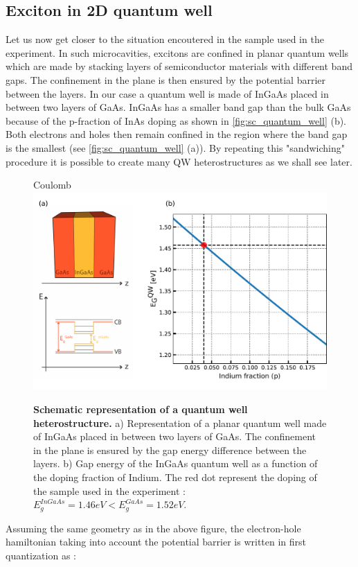 \subsection{Exciton in 2D quantum well}

Let us now get closer to the situation encoutered in the sample used in the experiment. In such microcavities, excitons are confined in planar quantum wells 
which are made by stacking layers of semiconductor materials with different band gaps. The confinement in the plane is then ensured by the potential barrier between the layers.
In our case a quantum well is made of InGaAs placed in between two layers of GaAs. InGaAs has a smaller band gap than the bulk GaAs because of the p-fraction of InAs doping as shown in \autoref{fig:sc_quantum_well} (b). 
Both electrons and holes then remain confined in the region where the band gap is the smallest (see \autoref{fig:sc_quantum_well} (a)).
By repeating this "sandwiching" procedure it is possible to create many QW heterostructures as we shall see later.
\begin{figure}[h]Coulomb
    \centering
    \includegraphics[width=0.8\linewidth]{chap_theory/fig/InGaAs.pdf}
    \caption{\textbf{Schematic representation of a quantum well heterostructure.} a) Representation of a planar quantum well made of InGaAs placed in between two layers of GaAs. The confinement in the plane is ensured by the gap energy difference between the layers.
    b) Gap energy of the InGaAs quantum well as a function of the doping fraction of Indium. The red dot represent the doping of the sample used in the experiment : $E_g^{InGaAs} = 1.46 eV < E_g^{GaAs} = 1.52 eV$.}
    \label{fig:sc_quantum_well}
\end{figure}

Assuming the same geometry as in the above figure, the electron-hole hamiltonian taking into account the potential barrier is written in first quantization as :

